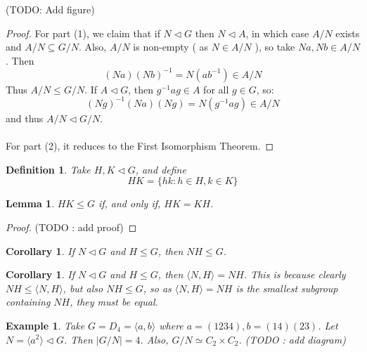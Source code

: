 \documentclass[a4paper,10pt]{article}
\newtheorem{Def}[thm]{Definition}
\newtheorem{Cor}[thm]{Corollary}
\newtheorem{eg}[thm]{Example}
\newtheorem{Lem}[thm]{Lemma}
\begin{document}
(TODO: Add figure)
\begin{proof}
For part (1), we claim that if $N \triangleleft G$ then $N \triangleleft A$, in which case $A / N$ exists and $A / N \subseteq G / N$. Also, $A / N$ is non-empty ( as $N \in A / N$ ), so take $Na, Nb \in A/N$. Then
\[ (Na)(Nb)^{-1} = N(ab^{-1}) \in A / N \]
Thus $A / N \leq G / N$. If $A \triangleleft G$, then $g^{-1} a g \in A$ for all $g \in G$, so:
\[ (Ng)^{-1} (Na) (Ng) = N(g^{-1}ag) \in A / N \]
and thus $A / N \triangleleft G / N$.  \\
\\
For part (2), it reduces to the First Isomorphism Theorem. 
\end{proof}

\begin{Def}
Take $H,K \triangleleft G$, and define
\[ HK = \{ hk : h\in H, k\in K \} \]
\end{Def}
\begin{Lem}
$HK \leq G$ if, and only if, $HK = KH$. 
\end{Lem}
\begin{proof}
(TODO : add proof)
\end{proof}
\begin{Cor}
If $N \triangleleft G$ and $H \leq G$, then $NH \leq G$. 
\end{Cor}
\begin{Cor}
If $N \triangleleft G$ and $H \leq G$, then $\langle N, H \rangle = NH$. This is because clearly $NH \leq \langle N, H \rangle$, but also $NH \leq G$, so as $\langle N, H \rangle = NH$ is the smallest subgroup containing $NH$, they must be equal.
\end{Cor}
\begin{eg}
Take $G = D_4 = \langle a , b \rangle$ where $a = (1234), b =(14)(23)$. Let $N = \langle a^2 \rangle \triangleleft G$. Then $| G / N | = 4$. Also, $G / N \simeq C_2 \times C_2$.
(TODO : add diagram)
\end{eg}


\newpage
\end{document}

